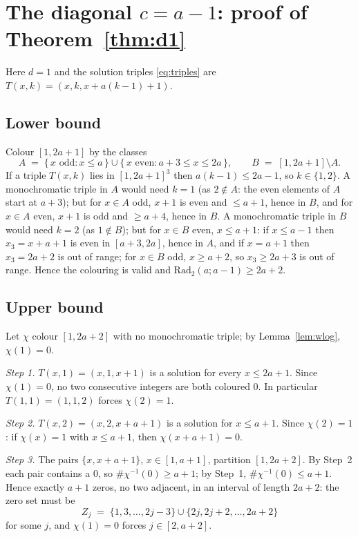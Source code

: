 \documentclass[11pt]{article}
\theoremstyle{remark}
\theoremstyle{definition}
\newcommand{\Rad}{\mathrm{Rad}_2}
\begin{document}
\section{The diagonal $c = a-1$: proof of Theorem~\ref{thm:d1}}\label{sec:d1}

Here $d = 1$ and the solution triples \eqref{eq:triples} are
$T(x,k) = (x, k, x + a(k-1) + 1)$.

\subsection*{Lower bound}
Colour $[1, 2a+1]$ by the classes
\[
A \;=\; \{\,x \text{ odd} : x \le a\,\} \cup \{\,x \text{ even} : a+3 \le x \le 2a\,\},
\qquad
B \;=\; [1, 2a+1] \setminus A .
\]
If a triple $T(x,k)$ lies in $[1, 2a+1]^3$ then $a(k-1) \le 2a-1$, so
$k \in \{1,2\}$. A monochromatic triple in $A$ would need $k = 1$ (as
$2 \notin A$: the even elements of $A$ start at $a+3$); but for $x \in A$ odd,
$x+1$ is even and $\le a+1$, hence in $B$, and for $x \in A$ even,
$x+1$ is odd and $\ge a+4$, hence in $B$. A monochromatic triple in $B$ would
need $k = 2$ (as $1 \notin B$); but for $x \in B$ even, $x \le a+1$: if
$x \le a-1$ then $x_3 = x + a + 1$ is even in $[a+3, 2a]$, hence in $A$,
and if $x = a+1$ then $x_3 = 2a+2$ is out of range; for $x \in B$ odd,
$x \ge a+2$, so $x_3 \ge 2a+3$ is out of range. Hence the colouring is valid
and $\Rad(a; a-1) \ge 2a+2$.

\subsection*{Upper bound}
Let $\chi$ colour $[1, 2a+2]$ with no monochromatic triple; by
Lemma~\ref{lem:wlog}, $\chi(1) = 0$.

\emph{Step 1.} $T(x,1) = (x,1,x+1)$ is a solution for every $x \le 2a+1$.
Since $\chi(1) = 0$, no two consecutive integers are both coloured $0$.
In particular $T(1,1) = (1,1,2)$ forces $\chi(2) = 1$.

\emph{Step 2.} $T(x,2) = (x,2,x+a+1)$ is a solution for $x \le a+1$. Since
$\chi(2) = 1$: if $\chi(x) = 1$ with $x \le a+1$, then $\chi(x+a+1) = 0$.

\emph{Step 3.} The pairs $\{x, x+a+1\}$, $x \in [1, a+1]$, partition
$[1, 2a+2]$. By Step~2 each pair contains a $0$, so $\#\chi^{-1}(0) \ge a+1$;
by Step~1, $\#\chi^{-1}(0) \le a+1$. Hence exactly $a+1$ zeros, no two
adjacent, in an interval of length $2a+2$: the zero set must be
\[
Z_j \;=\; \{1, 3, \dots, 2j-3\} \cup \{2j, 2j+2, \dots, 2a+2\}
\]
for some $j$, and $\chi(1) = 0$ forces $j \in [2, a+2]$.
\end{document}
